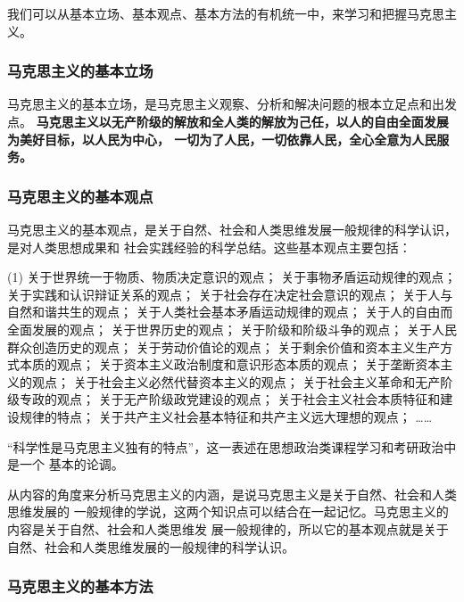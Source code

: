 \documentclass[10pt, UTF8]{book} %
\begin{document}
我们可以从基本立场、基本观点、基本方法的有机统一中，来学习和把握马克思主义。

\subsubsection{马克思主义的基本立场}

马克思主义的基本立场，是马克思主义观察、分析和解决问题的根本立足点和出发点。
\textbf{马克思主义以无产阶级的解放和全人类的解放为己任，以人的自由全面发展为美好目标，以人民为中心，
一切为了人民，一切依靠人民，全心全意为人民服务。}

\subsubsection{马克思主义的基本观点}

马克思主义的基本观点，是关于自然、社会和人类思维发展一般规律的科学认识，是对人类思想成果和
社会实践经验的科学总结。这些基本观点主要包括：
\begin{tasks}(1)
    \task 关于世界统一于物质、物质决定意识的观点；
    \task 关于事物矛盾运动规律的观点；
    \task 关于实践和认识辩证关系的观点；
    \task 关于社会存在决定社会意识的观点；
    \task 关于人与自然和谐共生的观点；
    \task 关于人类社会基本矛盾运动规律的观点；
    \task 关于人的自由而全面发展的观点；
    \task 关于世界历史的观点；
    \task 关于阶级和阶级斗争的观点；
    \task 关于人民群众创造历史的观点；
    \task 关于劳动价值论的观点；
    \task 关于剩余价值和资本主义生产方式本质的观点；
    \task 关于资本主义政治制度和意识形态本质的观点；
    \task 关于垄断资本主义的观点；
    \task 关于社会主义必然代替资本主义的观点；
    \task 关于社会主义革命和无产阶级专政的观点；
    \task 关于无产阶级政党建设的观点；
    \task 关于社会主义社会本质特征和建设规律的特点；
    \task 关于共产主义社会基本特征和共产主义远大理想的观点；
    \task ……
\end{tasks}
\begin{remark}
    “科学性是马克思主义独有的特点”，这一表述在思想政治类课程学习和考研政治中是一个
    基本的论调。
\end{remark}
\begin{remark}
    从内容的角度来分析马克思主义的内涵，是说{\kaishu 马克思主义是关于自然、社会和人类思维发展的
    一般规律的学说}，这两个知识点可以结合在一起记忆。马克思主义的内容是关于自然、社会和人类思维发
    展一般规律的，所以它的基本观点就是关于自然、社会和人类思维发展的一般规律的科学认识。
\end{remark}

\subsubsection{马克思主义的基本方法}
\end{document}
